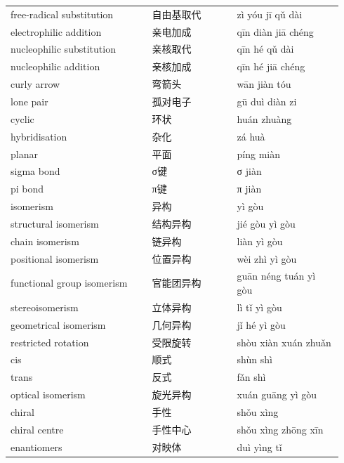 \documentclass[11pt]{article}
\begin{document}
\begin{longtable}{@{}p{0.40\linewidth}p{0.24\linewidth}p{0.30\linewidth}@{}}
free-radical substitution & 自由基取代 & zì yóu jī qǔ dài \\
electrophilic addition & 亲电加成 & qīn diàn jiā chéng \\
nucleophilic substitution & 亲核取代 & qīn hé qǔ dài \\
nucleophilic addition & 亲核加成 & qīn hé jiā chéng \\
curly arrow & 弯箭头 & wān jiàn tóu \\
lone pair & 孤对电子 & gū duì diàn zi \\
cyclic & 环状 & huán zhuàng \\
hybridisation & 杂化 & zá huà \\
planar & 平面 & píng miàn \\
sigma bond & σ键 & σ jiàn \\
pi bond & π键 & π jiàn \\
isomerism & 异构 & yì gòu \\
structural isomerism & 结构异构 & jié gòu yì gòu \\
chain isomerism & 链异构 & liàn yì gòu \\
positional isomerism & 位置异构 & wèi zhì yì gòu \\
functional group isomerism & 官能团异构 & guān néng tuán yì gòu \\
stereoisomerism & 立体异构 & lì tǐ yì gòu \\
geometrical isomerism & 几何异构 & jǐ hé yì gòu \\
restricted rotation & 受限旋转 & shòu xiàn xuán zhuǎn \\
cis & 顺式 & shùn shì \\
trans & 反式 & fǎn shì \\
optical isomerism & 旋光异构 & xuán guāng yì gòu \\
chiral & 手性 & shǒu xìng \\
chiral centre & 手性中心 & shǒu xìng zhōng xīn \\
enantiomers & 对映体 & duì yìng tǐ \\
\end{longtable}
\end{document}
